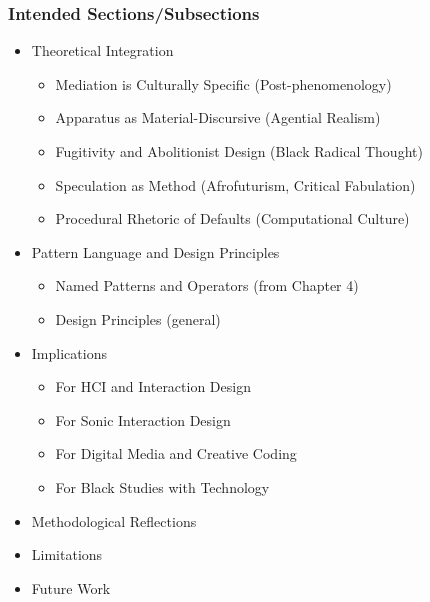 \subsubsection{Intended Sections/Subsections}
\begin{itemize}[nosep]
	\item Theoretical Integration
	\begin{itemize}[nosep]
		\item Mediation is Culturally Specific (Post-phenomenology)
		\item Apparatus as Material-Discursive (Agential Realism)
		\item Fugitivity and Abolitionist Design (Black Radical Thought)
		\item Speculation as Method (Afrofuturism, Critical Fabulation)
		\item Procedural Rhetoric of Defaults (Computational Culture)
	\end{itemize}
	\item Pattern Language and Design Principles
		\begin{itemize}[nosep]
			\item Named Patterns and Operators (from Chapter 4)
			\item Design Principles (general)
		\end{itemize}
	\item Implications
	\begin{itemize}[nosep]
		\item For HCI and Interaction Design
		\item For Sonic Interaction Design
		\item For Digital Media and Creative Coding
		\item For Black Studies with Technology
	\end{itemize}
	\item Methodological Reflections
	\item Limitations
	\item Future Work
\end{itemize}


